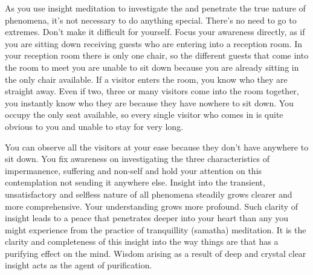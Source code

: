 As you use insight meditation to investigate the  and penetrate the true nature of phenomena, it's not necessary to do anything special. There's no need to go to extremes. Don't make it difficult for yourself. Focus your awareness directly, as if you are sitting down receiving guests who are entering into a reception room. In your reception room there is only one chair, so the different guests that come into the room to meet you are unable to sit down because you are already sitting in the only chair available. If a visitor enters the room, you know who they are straight away. Even if two, three or many visitors come into the room together, you instantly know who they are because they have nowhere to sit down. You occupy the only seat available, so every single visitor who comes in is quite obvious to you and unable to stay for very long.

You can observe all the visitors at your ease because they don't have anywhere to sit down. You fix awareness on investigating the three characteristics of impermanence, suffering and non-self and hold your attention on this contemplation not sending it anywhere else. Insight into the transient, unsatisfactory and selfless nature of all phenomena steadily grows clearer and more comprehensive. Your understanding grows more profound. Such clarity of insight leads to a peace that penetrates deeper into your heart than any you might experience from the practice of tranquillity (samatha) meditation. It is the clarity and completeness of this insight into the way things are that has a purifying effect on the mind. Wisdom arising as a result of deep and crystal clear insight acts as the agent of purification.

